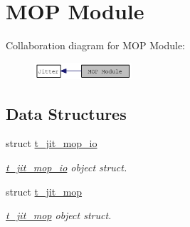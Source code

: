 \hypertarget{group__mopmod}{
\section{MOP Module}
\label{group__mopmod}
}


Collaboration diagram for MOP Module:\nopagebreak
\begin{figure}[H]
\begin{center}
\leavevmode
\includegraphics[width=103pt]{group__mopmod}
\end{center}
\end{figure}
\subsection*{Data Structures}
\begin{DoxyCompactItemize}
\item 
struct \hyperlink{structt__jit__mop__io}{t\_\-jit\_\-mop\_\-io}
\begin{DoxyCompactList}\small\item\em \hyperlink{structt__jit__mop__io}{t\_\-jit\_\-mop\_\-io} object struct. \item\end{DoxyCompactList}\item 
struct \hyperlink{structt__jit__mop}{t\_\-jit\_\-mop}
\begin{DoxyCompactList}\small\item\em \hyperlink{structt__jit__mop}{t\_\-jit\_\-mop} object struct. \item\end{DoxyCompactList}\end{DoxyCompactItemize}
